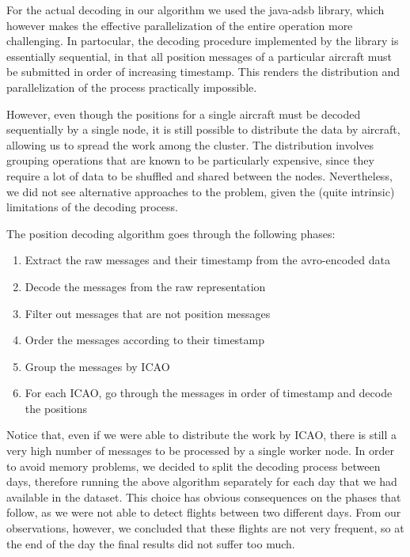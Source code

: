 \documentclass{vldb}
\begin{document}
For the actual decoding in our algorithm we used the java-adsb library, which
however makes the effective parallelization of the entire operation more
challenging. In partocular, the decoding procedure implemented by the library is
essentially sequential, in that all position messages of a particular aircraft
must be submitted in order of increasing timestamp. This renders the
distribution and parallelization of the process practically impossible.

However, even though the positions for a single aircraft must be decoded
sequentially by a single node, it is still possible to distribute the data by
aircraft, allowing us to spread the work among the cluster. The distribution
involves grouping operations that are known to be particularly expensive, since
they require a lot of data to be shuffled and shared between the nodes.
Nevertheless, we did not see alternative approaches to the problem, given the
(quite intrinsic) limitations of the decoding process.

The position decoding algorithm goes through the following phases:

\begin{enumerate}
  \item Extract the raw messages and their timestamp from the avro-encoded data
  \item Decode the messages from the raw representation
  \item Filter out messages that are not position messages
  \item Order the messages according to their timestamp
  \item Group the messages by ICAO
  \item For each ICAO, go through the messages in order of timestamp and decode
  the positions
\end{enumerate}

Notice that, even if we were able to distribute the work by ICAO, there is still
a very high number of messages to be processed by a single worker node. In order
to avoid memory problems, we decided to split the decoding process between days,
therefore running the above algorithm separately for each day that we had
available in the dataset. This choice has obvious consequences on the phases
that follow, as we were not able to detect flights between two different days.
From our observations, however, we concluded that these flights are not very
frequent, so at the end of the day the final results did not suffer too much.
\end{document}
